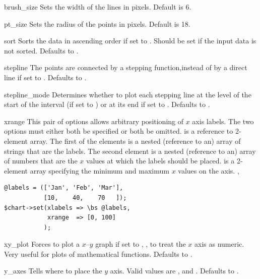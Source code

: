 \constructorblurb{\thisname}

\begin{AttrDecl}{brush\_size}
Sets the width of the lines in pixels. Default is 6.
\end{AttrDecl}

\begin{AttrDecl}{pt\_size}
Sets the radius of the points in pixels. Default is 18.
\end{AttrDecl}

\begin{AttrDecl}{sort}
Sorts the data in ascending order if set to . Should be
set if the input data is not sorted. Defaults to .
\end{AttrDecl}

\begin{AttrDecl}{stepline}
The points are connected by a stepping function,instead of by a direct
line if set to . Defaults to .
\end{AttrDecl}

\begin{AttrDecl}{stepline\_mode}
Determines whether to plot each stepping line at the level of the
start of the interval (if set to ) or at its end if set
to . Defaults to .
\end{AttrDecl}

\begin{AttrDecl}{xrange}
This pair of options allows arbitrary positioning of $x$ axis labels.
The two options must either both be specified or both be omitted.
 is a reference to 2-element array. The first of the
elements is a nested (reference to an) array of strings that are the
labels. The second element is a nested (reference to an) array of
numbers that are the $x$ values at which the labels should be placed.
 is a 2-element array specifying the minimum and maximum
$x$ values on the axis. \Eg,
\begin{verbatim}
@labels = (['Jan', 'Feb', 'Mar'],
           [10,    40,    70   ]);
$chart->set(xlabels => \bs @labels,
            xrange  => [0, 100]
           );
\end{verbatim}
\end{AttrDecl}

\begin{AttrDecl}{xy\_plot}
Forces \thisclass to plot a $x$--$y$ graph if set to , \ie, to
treat the $x$ axis as numeric. Very useful for plots of mathematical
functions. Defaults to .
\end{AttrDecl}

\begin{AttrDecl}{y\_axes}
Tells \thisclass where to place the $y$ axis. Valid
values are ,  and . Defaults
to .
\end{AttrDecl}
